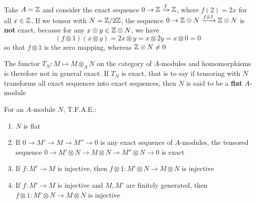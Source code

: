 \documentclass[11pt]{article}
\begin{document}
\begin{examplle}[]
Take \(A=\mathbb{Z}\) and consider the exact sequence \(0\to\mathbb{Z}\xrightarrow{f}\mathbb{Z}\), where \(f(2)=2x\) for all \(x\in\mathbb{Z}\). If
we tensor with \(N=\mathbb{Z}/2\mathbb{Z}\), the sequence \(0\to\mathbb{Z}\otimes N\xrightarrow{f\otimes 1}\mathbb{Z}\otimes N\) is \textbf{not} exact, because for
any \(x\otimes y\in\mathbb{Z}\otimes N\), we have
\begin{equation*}
(f\otimes 1)(x\otimes y)=2x\otimes y=x\otimes 2y=x\otimes 0=0
\end{equation*}
so that \(f\otimes 1\) is the zero mapping, whereas \(\mathbb{Z}\otimes N\neq 0\)
\end{examplle}

The functor \(T_N:M\mapsto M\otimes_AN\) on the category of \(A\)-modules and homomorphisms is therefore not
in general exact. If \(T_N\) is exact, that is to say if tensoring with \(N\) transforms all
exact sequences into exact sequences, then \(N\) is said to be a \textbf{flat} \(A\)-module

\begin{proposition}[]
For an \(A\)-module \(N\), T.F.A.E.:
\begin{enumerate}
\item \(N\) is flat
\item If \(0\to M'\to M\to M''\to 0\) is any exact sequence of \(A\)-modules, the tensored
sequence \(0\to M'\otimes N\to M\otimes N\to M''\otimes N\to 0\) is exact
\item If \(f:M'\to M\) is injective, then \(f\otimes 1:M'\otimes N\to M\otimes N\) is injective
\item If \(f:M'\to M\) is injective and \(M,M'\) are finitely generated, then \(f\otimes 1:M'\otimes N\to M\otimes N\) is injective
\end{enumerate}
\end{proposition}
\end{document}
